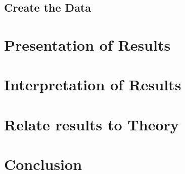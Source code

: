\documentclass{article}
\begin{document}
\subsection{Create the Data}

\section{Presentation of Results}

\section{Interpretation of Results}

\section{Relate results to Theory}

\section{Conclusion}
\end{document}
